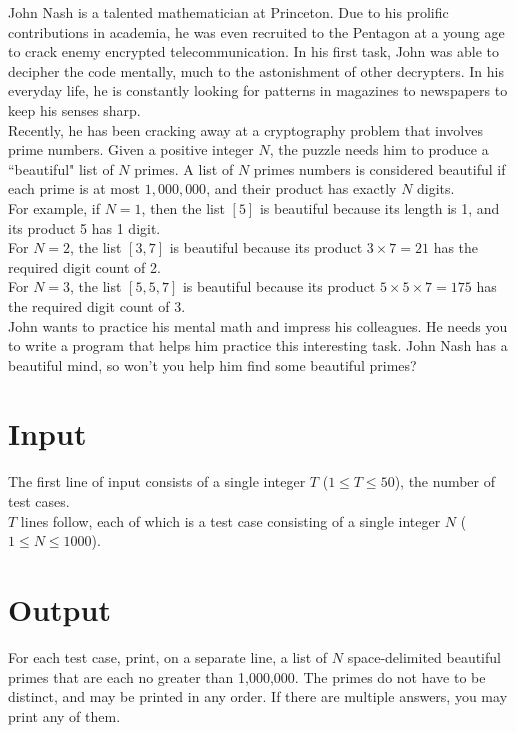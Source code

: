 
\noindent John Nash is a talented mathematician at Princeton. Due to his prolific contributions in academia, he was even recruited to the Pentagon at a young age to crack enemy encrypted telecommunication. In his first task, John was able to decipher the code mentally, much to the astonishment of other decrypters. In his everyday life, he is constantly looking for patterns in magazines to newspapers to keep his senses sharp.\\

Recently, he has been cracking away at a cryptography problem that involves prime numbers. Given a positive integer $N$, the puzzle needs him to produce a ``beautiful" list of $N$ primes. A list of $N$ primes numbers is considered beautiful if each prime is at most $1,000,000$, and their product has exactly $N$ digits.\\

For example, if $N = 1$, then the list $[5]$ is beautiful because its length is 1, and its product 5 has 1 digit.\\

For $N = 2$, the list $[3, 7]$ is beautiful because its product $3 \times 7 = 21$ has the required digit count of 2.\\

For $N = 3$, the list $[5, 5, 7]$ is beautiful because its product $5 \times 5 \times 7 = 175$ has the required digit count of 3.\\

John wants to practice his mental math and impress his colleagues. He needs you to write a program that helps him practice this interesting task. John Nash has a beautiful mind, so won't you help him find some beautiful primes?

\section*{Input}
The first line of input consists of a single integer $T$ ($1 \leq T \leq 50$), the number of test cases.\\
$T$ lines follow, each of which is a test case consisting of a single integer $N$ ($1 \leq N \leq 1000$).

\section*{Output}
For each test case, print, on a separate line, a list of $N$ space-delimited beautiful primes that are each no greater than 1,000,000. The primes do not have to be distinct, and may be printed in any order. If there are multiple answers, you may print any of them.\\
